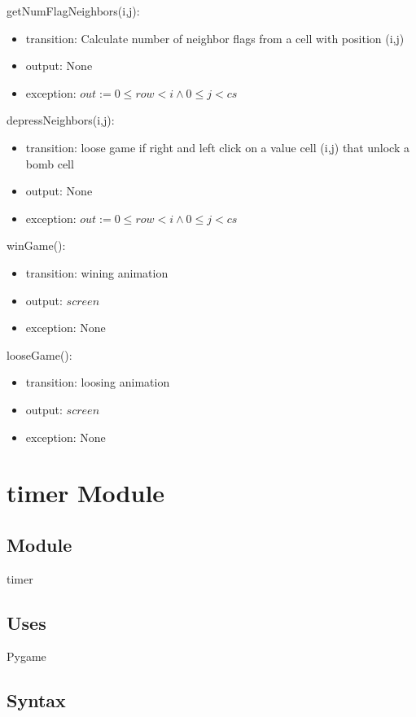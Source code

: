 \documentclass[12pt]{article}
\begin{document}
\noindent getNumFlagNeighbors(i,j):
\begin{itemize}
\item transition: Calculate number of neighbor flags from a cell with position (i,j)
\item output: None
\item exception: $out:=0\leq row < i \land 0 \leq j < cs$
\end{itemize}

\noindent depressNeighbors(i,j):
\begin{itemize}
\item transition: loose game if right and left click on a value cell (i,j) that unlock a bomb cell
\item output: None
\item exception: $out:=0\leq row < i \land 0 \leq j < cs$
\end{itemize}

\noindent winGame():
\begin{itemize}
\item transition: wining animation 
\item output: $screen$
\item exception: None
\end{itemize}

\noindent looseGame():
\begin{itemize}
\item transition: loosing animation 
\item output: $screen$
\item exception: None
\end{itemize}

\newpage

\section {timer Module}

\subsection{Module}

timer

\subsection {Uses}

Pygame

\subsection {Syntax}
\end{document}
